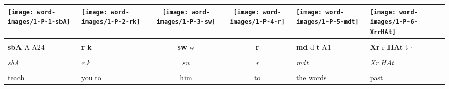\vspace{7.5mm}

\begin{tabularx}{\linewidth}{YYccYY}
	\hspace*{-2mm} \texttt{[image: word-images/1-P-1-sbA]} &
	\hspace*{-8mm} \texttt{[image: word-images/1-P-2-rk]} &
	\hspace*{-12mm} \texttt{[image: word-images/1-P-3-sw]} &
	\hspace*{-6mm} \texttt{[image: word-images/1-P-4-r]} &
	\hspace*{-6mm} \texttt{[image: word-images/1-P-5-mdt]} &
	\hspace*{-8mm} \texttt{[image: word-images/1-P-6-XrrHAt]} \\
	\hline \\ 
	\textbf{sbA} A A24 &
	\hspace*{-8mm}\textbf{r} \textbf{k} &
	\hspace*{-12mm}\textbf{sw} w &
	\hspace*{-4mm}\textbf{r} &
	\textbf{md} d \textbf{t} A1 &
	\textbf{Xr} r \textbf{HAt} t $\cdot$ \\
	\hline \\ 
	\textit{sbA} & \hspace*{-8mm}\textit{r.k} & \hspace*{-12mm}\textit{sw} & \hspace*{-4mm}\textit{r} & \textit{mdt} & \textit{Xr HAt} \\
	\hline \\ 
	teach & \hspace*{-10mm}you to & \hspace*{-12mm}him & \hspace*{-4mm}to & the words & past
\end{tabularx}

\vspace{7.5mm}

